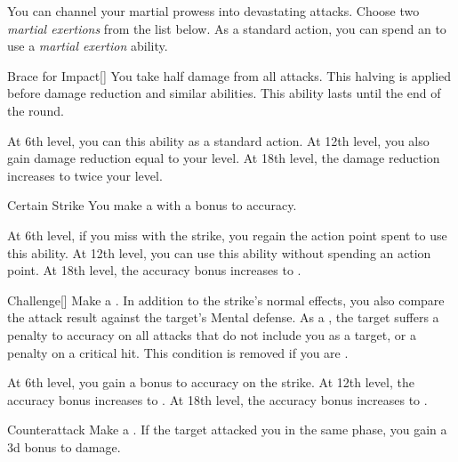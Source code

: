         You can channel your martial prowess into devastating attacks.
        Choose two \textit{martial exertions} from the list below.
        As a standard action, you can spend an  to use a \textit{martial exertion} ability.
        {
            \begin{ability}{Brace for Impact}[]
                You take half damage from all attacks.
                This halving is applied before damage reduction and similar abilities.
                This ability lasts until the end of the round.

                At 6th level, you can  this ability as a standard action.
                At 12th level, you also gain damage reduction equal to your level.
                At 18th level, the damage reduction increases to twice your level.
            \end{ability}

            \begin{ability}{Certain Strike}
                You make a  with a  bonus to accuracy.

                At 6th level, if you miss with the strike, you regain the action point spent to use this ability.
                At 12th level, you can use this ability without spending an action point.
                At 18th level, the accuracy bonus increases to .
            \end{ability}

            \begin{ability}{Challenge}[]
                Make a .
                In addition to the strike's normal effects, you also compare the attack result against the target's Mental defense.
                As a , the target suffers a  penalty to accuracy on all attacks that do not include you as a target, or a  penalty on a critical hit.
                This condition is removed if you are .

                At 6th level, you gain a  bonus to accuracy on the strike.
                At 12th level, the accuracy bonus increases to .
                At 18th level, the accuracy bonus increases to .
            \end{ability}

            \begin{ability}{Counterattack}
                Make a .
                If the target attacked you in the same phase, you gain a \plus3d bonus to damage.


\end{ability}}
